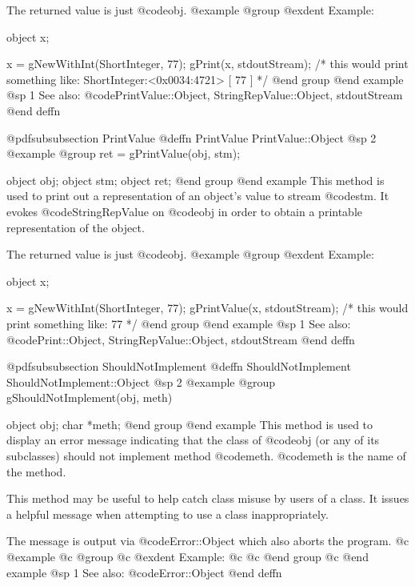 The returned value is just @code{obj}.
@example
@group
@exdent Example:

object  x;

x = gNewWithInt(ShortInteger, 77);
gPrint(x, stdoutStream);
/* this would print something like:  
      ShortInteger:<0x0034:4721> [ 77 ] */
@end group
@end example
@sp 1
See also:  @code{PrintValue::Object, StringRepValue::Object, stdoutStream}
@end deffn










@pdfsubsubsection {PrintValue}
@deffn {PrintValue} PrintValue::Object
@sp 2
@example
@group
ret = gPrintValue(obj, stm);

object  obj;
object  stm;
object  ret;
@end group
@end example
This method is used to print out a representation of an object's
value to stream @code{stm}.  It evokes @code{StringRepValue}
on @code{obj} in order to obtain a printable representation of
the object.

The returned value is just @code{obj}.
@example
@group
@exdent Example:

object  x;

x = gNewWithInt(ShortInteger, 77);
gPrintValue(x, stdoutStream);
/* this would print something like:  77  */
@end group
@end example
@sp 1
See also:  @code{Print::Object, StringRepValue::Object, stdoutStream}
@end deffn










@pdfsubsubsection {ShouldNotImplement}
@deffn {ShouldNotImplement} ShouldNotImplement::Object
@sp 2
@example
@group
gShouldNotImplement(obj, meth)

object  obj;
char    *meth;
@end group
@end example
This method is used to display an error message indicating that the
class of @code{obj} (or any of its subclasses) should not implement
method @code{meth}.  @code{meth} is the name of the method.

This method may be useful to help catch class misuse by users of a
class.  It issues a helpful message when attempting to use a class
inappropriately.

The message is output via @code{Error::Object} which also aborts the
program.
@c @example
@c @group
@c @exdent Example:
@c 
@c @end group
@c @end example
@sp 1
See also:  @code{Error::Object}
@end deffn















